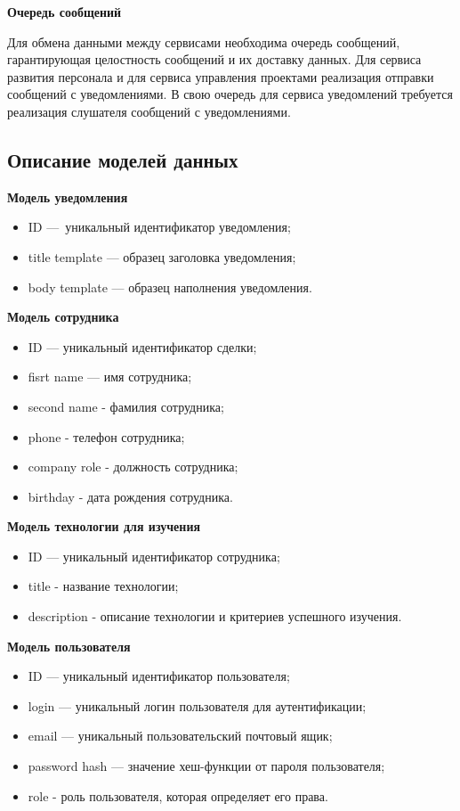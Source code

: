 \bigskip
\textbf{Очередь сообщений}

Для обмена данными между сервисами необходима очередь сообщений, гарантирующая целостность сообщений и их доставку данных. Для сервиса развития персонала и для сервиса управления проектами реализация отправки сообщений с уведомлениями. В свою очередь для сервиса уведомлений требуется реализация слушателя сообщений с уведомлениями.

\subsection{Описание моделей данных}\label{sec:domain:models}

\textbf{Модель уведомления}

\begin{itemize}
    \item ID — уникальный идентификатор уведомления;
    \item title template — образец заголовка уведомления;
    \item body template — образец наполнения уведомления.
\end{itemize}

\bigskip
\textbf{Модель сотрудника}

\begin{itemize}
    \item ID — уникальный идентификатор сделки;
    \item fisrt name — имя сотрудника;
    \item second name - фамилия сотрудника;
    \item phone - телефон сотрудника;
    \item company role - должность сотрудника;
    \item birthday - дата рождения сотрудника.
\end{itemize}

\bigskip
\textbf{Модель технологии для изучения}

\begin{itemize}
    \item ID — уникальный идентификатор сотрудника;
    \item title - название технологии;
    \item description - описание технологии и критериев успешного изучения.
\end{itemize}

\bigskip
\textbf{Модель пользователя}

\begin{itemize}
    \item ID — уникальный идентификатор пользователя;
    \item login — уникальный логин пользователя для аутентификации;
    \item email — уникальный пользовательский почтовый ящик;
    \item password hash — значение хеш-функции от пароля пользователя;
    \item role - роль пользователя, которая определяет его права.
\end{itemize}


